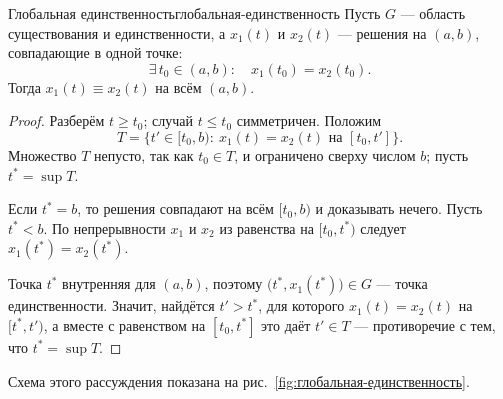 \begin{Theorem}{Глобальная единственность}{глобальная-единственность}
	Пусть $G$ --- область существования и единственности, а $x_1(t)$ и $x_2(t)$
	--- решения на $(a,b)$, совпадающие в одной точке:
	\[
	\exists\, t_0 \in (a,b) \colon \quad x_1(t_0) = x_2(t_0).
	\]
	Тогда $x_1(t) \equiv x_2(t)$ на всём $(a,b)$.
\end{Theorem}

\begin{proof}
	Разберём $t \geqslant t_0$; случай $t \leqslant t_0$ симметричен. Положим
	\[
	T = \bigl\{t' \in [t_0, b) \colon\ x_1(t) = x_2(t) \text{ на } [t_0, t']\bigr\}.
	\]
	Множество $T$ непусто, так как $t_0 \in T$, и ограничено сверху числом $b$;
	пусть $t^{*} = \sup T$.

	\medskip
	Если $t^{*} = b$, то решения совпадают на всём $[t_0, b)$ и доказывать
	нечего. Пусть $t^{*} < b$. По непрерывности $x_1$ и $x_2$ из равенства на
	$[t_0, t^{*})$ следует $x_1(t^{*}) = x_2(t^{*})$.

	\medskip
	Точка $t^{*}$ внутренняя для $(a,b)$, поэтому
	$\bigl(t^{*}, x_1(t^{*})\bigr) \in G$ --- точка единственности. Значит,
	найдётся $t' > t^{*}$, для которого $x_1(t) = x_2(t)$ на $[t^{*}, t')$, а
	вместе с равенством на $[t_0, t^{*}]$ это даёт $t' \in T$ --- противоречие с
	тем, что $t^{*} = \sup T$.
\end{proof}

Схема этого рассуждения показана на рис.~\ref{fig:глобальная-единственность}.

